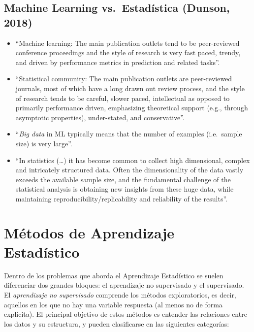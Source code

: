 \documentclass[
]{book}
\theoremstyle{break}
\theoremstyle{definition}
\theoremstyle{definition}
\theoremstyle{definition}
\theoremstyle{remark}
\begin{document}
\hypertarget{machine-learning-vs.-estaduxedstica-dunson-2018}{%
\subsection{Machine Learning vs.~Estadística (Dunson, 2018)}\label{machine-learning-vs.-estaduxedstica-dunson-2018}}

\begin{itemize}
\item
  ``Machine learning: The main publication outlets tend to be peer-reviewed conference proceedings and the style of research is very fast paced, trendy, and driven by performance metrics in prediction and related tasks''.
\item
  ``Statistical community: The main publication outlets are peer-reviewed journals, most of which have a long drawn out review process, and the style of research tends to be careful, slower paced, intellectual as opposed to primarily performance driven, emphasizing theoretical support (e.g., through asymptotic properties), under-stated, and conservative''.
\item
  ``\emph{Big data} in ML typically means that the number of examples (i.e.~sample size) is very large''.
\item
  ``In statistics (\ldots) it has become common to collect high dimensional, complex and intricately structured data. Often the dimensionality of the data vastly exceeds the available sample size, and the fundamental challenge of the statistical analysis is obtaining new insights from these huge data, while maintaining reproducibility/replicability and reliability of the results''.
\end{itemize}

\hypertarget{muxe9todos-de-aprendizaje-estaduxedstico}{%
\section{Métodos de Aprendizaje Estadístico}\label{muxe9todos-de-aprendizaje-estaduxedstico}}

Dentro de los problemas que aborda el Aprendizaje Estadístico se suelen diferenciar dos grandes bloques: el aprendizaje no supervisado y el supervisado. El \emph{aprendizaje no supervisado} comprende los métodos exploratorios, es decir, aquellos en los que no hay una variable respuesta (al menos no de forma explícita). El principal objetivo de estos métodos es entender las relaciones entre los datos y su estructura, y pueden clasificarse en las siguientes categorías:
\end{document}
